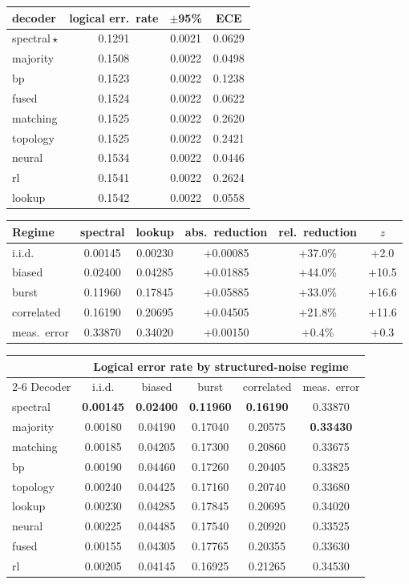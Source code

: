 \begin{tabular}{lccc}
\toprule
decoder & logical err.\ rate & $\pm$95\% & ECE \\
\midrule
spectral\,$\star$ & 0.1291 & 0.0021 & 0.0629 \\
majority & 0.1508 & 0.0022 & 0.0498 \\
bp & 0.1523 & 0.0022 & 0.1238 \\
fused & 0.1524 & 0.0022 & 0.0622 \\
matching & 0.1525 & 0.0022 & 0.2620 \\
topology & 0.1525 & 0.0022 & 0.2421 \\
neural & 0.1534 & 0.0022 & 0.0446 \\
rl & 0.1541 & 0.0022 & 0.2624 \\
lookup & 0.1542 & 0.0022 & 0.0558 \\
\bottomrule
\end{tabular}

\begin{tabular}{lccccc}
\toprule
Regime & spectral & lookup & abs.\ reduction & rel.\ reduction & $z$ \\
\midrule
i.i.d. & 0.00145 & 0.00230 & +0.00085 & +37.0\% & +2.0 \\
biased & 0.02400 & 0.04285 & +0.01885 & +44.0\% & +10.5 \\
burst & 0.11960 & 0.17845 & +0.05885 & +33.0\% & +16.6 \\
correlated & 0.16190 & 0.20695 & +0.04505 & +21.8\% & +11.6 \\
meas.\ error & 0.33870 & 0.34020 & +0.00150 & +0.4\% & +0.3 \\
\bottomrule
\end{tabular}

\begin{tabular}{lccccc}
\toprule
 & \multicolumn{5}{c}{Logical error rate by structured-noise regime} \\
\cmidrule(lr){2-6}
Decoder & i.i.d. & biased & burst & correlated & meas.\ error \\
\midrule
spectral  & \textbf{0.00145} & \textbf{0.02400} & \textbf{0.11960} & \textbf{0.16190} & 0.33870 \\
majority  & 0.00180 & 0.04190 & 0.17040 & 0.20575 & \textbf{0.33430} \\
matching  & 0.00185 & 0.04205 & 0.17300 & 0.20860 & 0.33675 \\
bp        & 0.00190 & 0.04460 & 0.17260 & 0.20405 & 0.33825 \\
topology  & 0.00240 & 0.04425 & 0.17160 & 0.20740 & 0.33680 \\
lookup    & 0.00230 & 0.04285 & 0.17845 & 0.20695 & 0.34020 \\
neural    & 0.00225 & 0.04485 & 0.17540 & 0.20920 & 0.33525 \\
fused     & 0.00155 & 0.04305 & 0.17765 & 0.20355 & 0.33630 \\
rl        & 0.00205 & 0.04145 & 0.16925 & 0.21265 & 0.34530 \\
\bottomrule
\end{tabular}

